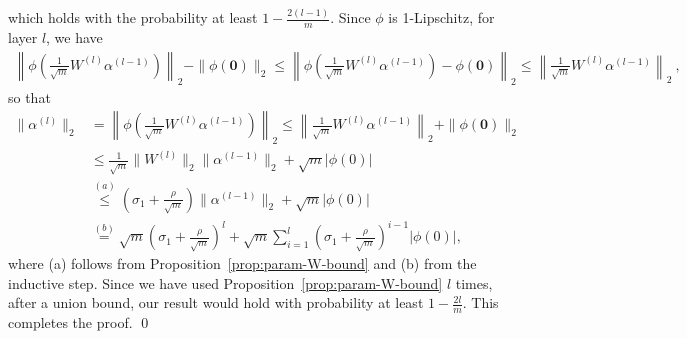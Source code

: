 which holds with the probability at least $1-\frac{2(l-1)}{m}$. Since $\phi$ is 1-Lipschitz, for layer $l$, we have
\begin{align*}
\left\|\phi\left( \frac{1}{\sqrt{m}} W^{(l)} \alpha^{(l-1)} \right) \right\|_2 - \| \phi(\mathbf{0}) \|_2 
\leq \left\|\phi\left( \frac{1}{\sqrt{m}} W^{(l)} \alpha^{(l-1)} \right) - \phi(\mathbf{0}) \right\|_2 \leq \left\|  \frac{1}{\sqrt{m}} W^{(l)} \alpha^{(l-1)} \right\|_2 ~,    
\end{align*}
so that
\begin{align*}
\|\alpha^{(l)}\|_2 & = \left\| \phi\left( \frac{1}{\sqrt{m}} W^{(l)} \alpha^{(l-1)} \right) \right\|_2 
\leq  \left\|  \frac{1}{\sqrt{m}} W^{(l)} \alpha^{(l-1)} \right\|_2 + \| \phi(\mathbf{0}) \|_2 \\
& \leq  \frac{1}{\sqrt{m}} \| W^{(l)} \|_2 \|\alpha^{(l-1)} \|_2 + \sqrt{m} |\phi(0)|  \\
& \overset{(a)}{\leq} \left( \sigma_1 + \frac{\rho}{\sqrt{m}}\right) \|\alpha^{(l-1)} \|_2 + \sqrt{m} |\phi(0)|  \\
& \overset{(b)}{=} \sqrt{m} \left( \sigma_1 + \frac{\rho}{\sqrt{m}}\right)^{l} + \sqrt{m} \sum_{i=1}^{l}  \left(\sigma_1 + \frac{\rho}{\sqrt{m}} \right)^{i-1} |\phi(0)|,
\end{align*}
where (a) follows from Proposition~\ref{prop:param-W-bound} and (b) from the inductive step. Since we have used Proposition~\ref{prop:param-W-bound} $l$ times, after a union bound, our result would hold with probability at least $1-\frac{2l}{m}$.  This completes the proof. \qed 

